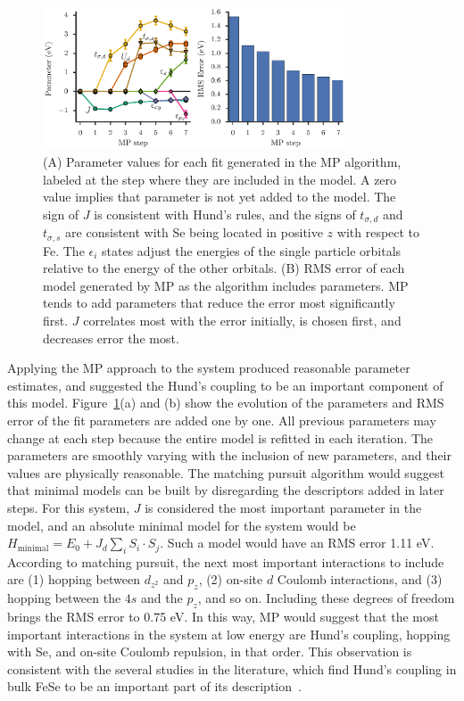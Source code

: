 \begin{figure}
  \centering
  \includegraphics[width=0.8\textwidth]{./Figures/fese.eps}
  \caption{
    \label{fig:fese} 
    (A) Parameter values for each fit generated in the MP algorithm, labeled at the step where they are included in the model. 
    A zero value implies that parameter is not yet added to the model.
    The sign of $J$ is consistent with Hund's rules, and the signs of $t_{\sigma,d}$ and $t_{\sigma,s}$ are consistent with Se being located in positive $z$ with respect to Fe. 
    The $\epsilon_i$ states adjust the energies of the single particle orbitals relative to the energy of the other orbitals.
    (B) RMS error of each model generated by MP as the algorithm includes parameters. 
    MP tends to add parameters that reduce the error most significantly first. 
    $J$ correlates most with the error initially, is chosen first, and decreases error the most.
  }
\end{figure}

Applying the MP approach to the system produced reasonable parameter estimates, and suggested the Hund's coupling to be an important component of this model.
Figure~\ref{fig:fese}(a) and (b) show the evolution of the parameters and RMS error of the fit parameters are added one by one.
All previous parameters may change at each step because the entire model is refitted in each iteration.
The parameters are smoothly varying with the inclusion of new parameters, and their values are physically reasonable.
The matching pursuit algorithm would suggest that minimal models can be built by disregarding the descriptors added in later steps.
For this system, $J$ is considered the most important parameter in the model, and an absolute minimal model for the system would be $H_\text{minimal} = E_0 + J_d \sum_i S_i \cdot S_j$. 
Such a model would have an RMS error 1.11 eV. 
According to matching pursuit, the next most important interactions to include are (1) hopping between $d_{z^2}$ and $p_z$, (2) on-site $d$ Coulomb interactions, and (3) hopping between the $4s$ and the $p_z$, and so on. 
Including these degrees of freedom brings the RMS error to 0.75 eV.
In this way, MP would suggest that the most important interactions in the system at low energy are Hund's coupling, hopping with Se, and on-site Coulomb repulsion, in that order.
This observation is consistent with the several studies in the literature, which find Hund's coupling in bulk FeSe to be an important part of its description~\cite{demedici_hunds_2011,de_medici_janus-faced_2011,georges_strong_2013,busemeyer_competing_2016}.

